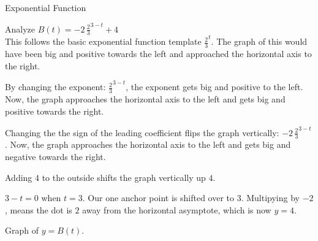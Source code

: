 \documentclass{ximera}
\begin{document}
\begin{example}  Exponential Function



Analyze   $B(t) = -2 \, \frac{2}{3}^{3-t} + 4$ \\



This follows the basic exponential function template $\frac{2}{3}^t$.  The graph of this would have been big and positive towards the left and approached the horizontal axis to the right.




By changing the exponent: $\frac{2}{3}^{3-t}$, the exponent gets big and positive to the left.  Now, the graph approaches the horizontal axis to the left and gets big and positive towards the right.



Changing the the sign of the leading coefficient flips the graph vertically: $-2  \, \frac{2}{3}^{3-t}$.  Now, the graph approaches the horizontal axis to the left and gets big and negative towards the right.


Adding $4$ to the outside shifts the graph vertically up $4$.


$3-t=0$ when $t=3$. Our one anchor point is shifted over to $3$.  Multipying by $-2$, means the dot is $2$ away from the horizontal asymptote, which is now $y=4$.





Graph of $y = B(t)$.

\begin{image}
\end{image}
\end{example}
\end{document}
